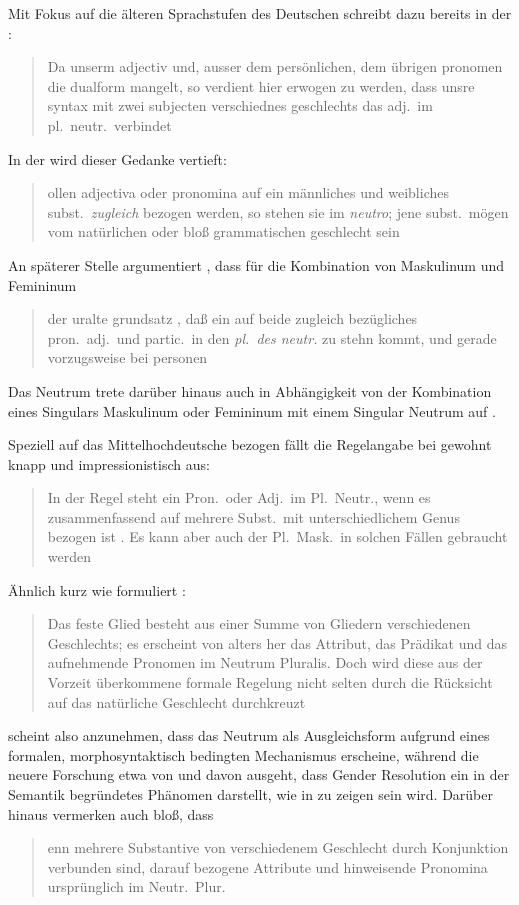 Mit Fokus auf die älteren Sprachstufen des Deutschen schreibt dazu bereits
\citeauthor{grimm1848} in der :
\blockcquote[978]{grimm1848}{Da unserm adjectiv und, ausser dem
persönlichen, dem übrigen pronomen die dualform mangelt, so verdient hier
erwogen zu werden, dass unsre syntax mit zwei subjecten verschiednes
geschlechts das adj.\ im pl.~neutr.\ verbindet}. In der  wird dieser Gedanke vertieft:
\blockcquote[311--312]{grimm1890}{ollen adjectiva oder pronomina
auf ein männliches und weibliches subst.\ \emph{zugleich} bezogen werden, so
stehen sie im \emph{neutro}; jene subst.\ mögen vom natürlichen oder bloß
grammatischen geschlecht sein}. An späterer Stelle argumentiert
\citeauthor{grimm1898}, dass für die Kombination von Maskulinum und Femininum
\blockcquote[329]{grimm1898}{der uralte grundsatz , daß ein auf
beide zugleich bezügliches pron.\ adj.\ und partic.\ in den \emph{pl.\ des
neutr.} zu stehn kommt, und gerade vorzugsweise bei personen}. Das Neutrum
trete darüber hinaus auch in Abhängigkeit von der Kombination eines Singulars
Maskulinum oder Femininum mit einem Singular Neutrum auf
\autocite[331]{grimm1898}.

Speziell auf das Mittelhochdeutsche bezogen fällt die
Regelangabe bei \citeauthor{paul2007} gewohnt knapp und impressionistisch aus:
\blockcquote[384]{paul2007}{In der Regel steht ein Pron.\ oder Adj.\ im
Pl.~Neutr., wenn es zusammenfassend auf mehrere Subst.\ mit unterschiedlichem
Genus bezogen ist \textelp{}. Es kann aber auch der Pl.~Mask.\ in solchen
Fällen gebraucht werden}. Ähnlich kurz wie \citet{paul2007} formuliert
\citet[39]{behaghel1928}: \blockquote{Das feste Glied besteht aus einer Summe
von Gliedern verschiedenen Geschlechts; es erscheint von alters her das
Attribut, das Prädikat und das aufnehmende Pronomen im Neutrum Pluralis.
\textelp{} Doch wird diese aus der Vorzeit überkommene formale Regelung nicht
selten durch die Rücksicht auf das natürliche Geschlecht durchkreuzt}.

\citet{behaghel1928} scheint also anzunehmen, dass das Neutrum als
Ausgleichsform aufgrund eines formalen, morphosyntaktisch bedingten Mechanismus
erscheine, während die neuere Forschung etwa von \citet{wechslerzlatic2003} und
\citet{wechsler2009} davon ausgeht, dass Gender Resolution ein in der Semantik
begründetes Phänomen darstellt, wie in  zu zeigen sein
wird. Darüber hinaus vermerken auch \citet[188]{dal2014} bloß, dass
\blockquote{enn mehrere Substantive von verschiedenem Geschlecht
durch Konjunktion verbunden sind, \textelp{} darauf bezogene Attribute und
hinweisende Pronomina ursprünglich im Neutr.\ Plur.\ }.

